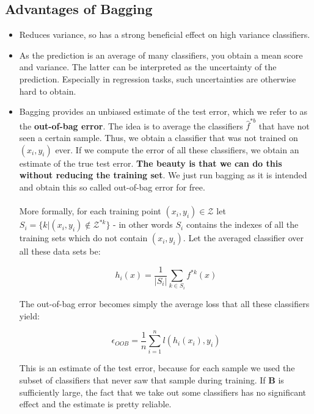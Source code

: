 \documentclass[twoside]{article}
\begin{document}
\subsection{Advantages of Bagging}
\begin{itemize}
    \item Reduces variance, so has a strong beneficial effect on high variance classifiers.
    \item As the prediction is an average of many classifiers, you obtain a mean score and variance. The latter can be interpreted as the uncertainty of the prediction. Especially in regression tasks, such uncertainties are otherwise hard to obtain.
    \item Bagging provides an unbiased estimate of the test error, which we refer to as the \textbf{out-of-bag error}. The idea is to  average the classifiers $\hat{f}^{*b}$  that have not seen a certain sample. Thus, we obtain a classifier that was not trained on $(x_{i},y_{i})$ ever. If we compute the error of all these classifiers, we obtain an estimate of the true test error. \textbf{The beauty is that we can do this without reducing the training set}. We just run bagging as it is intended and obtain this so called out-of-bag error for free. \\ \\
    More formally, for each training point $(x_{i},y_{i}) \in \mathcal{Z}$ let $S_{i}=\{ k| (x_{i},y_{i}) \not \in \mathcal{Z}^{*k}\}$ - in other words $S_{i}$ contains the indexes of all the training sets which do not contain $(x_{i},y_{i})$. Let the averaged classifier over all these data sets be:
    
    \begin{equation*}
        h_{i}(x) = \dfrac{1}{|S_{i}|} \sum_{k \in S_{i}} f^{*k}(x)
    \end{equation*}
    
    The out-of-bag error becomes simply the average loss that all these classifiers yield:
    
    \begin{equation*}
    \epsilon_{OOB} = \dfrac{1}{n} \sum_{i=1}^{n} l(h_{i}(x_{i}),y_{i})
    \end{equation*}

This is an estimate of the test error, because for each sample we used the subset of classifiers that never saw that sample during training. If $\mathbf{B}$ is sufficiently large, the fact that we take out some classifiers has no significant effect and the estimate is pretty reliable.
\end{itemize}
\end{document}
